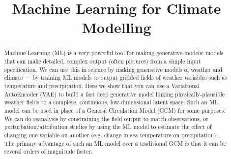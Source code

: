 \documentclass[gmd,manuscript]{copernicus}
\begin{document}
\title{Machine Learning for Climate Modelling}











\received{}
\pubdiscuss{} %
\revised{}
\accepted{}
\published{}



\maketitle

\begin{abstract}
Machine Learning (ML) is a very powerful tool for making generative models: models that can make detailed, complex output (often pictures) from a simple input specification. We can use this in science by making generative models of weather and climate --- by training ML models to output gridded fields of weather variables such as temperature and precipitation. Here we show that you can use a Variational AutoEncoder (VAE) to build a fast deep generative model linking physically-plausible weather fields to a complete, continuous, low-dimensional latent space. Such an ML model can be used in place of a General Circulation Model (GCM) for some purposes: We can do reanalysis by constraining the field output to match observations, or perturbation/attribution studies by using the ML model to estimate the effect of changing one variable on another (e.g. change in sea temperature on precipitation). The primary advantage of such an ML model over a traditional GCM is that it can be several orders of magnitude faster.
\end{abstract}




\introduction  %
\end{document}
